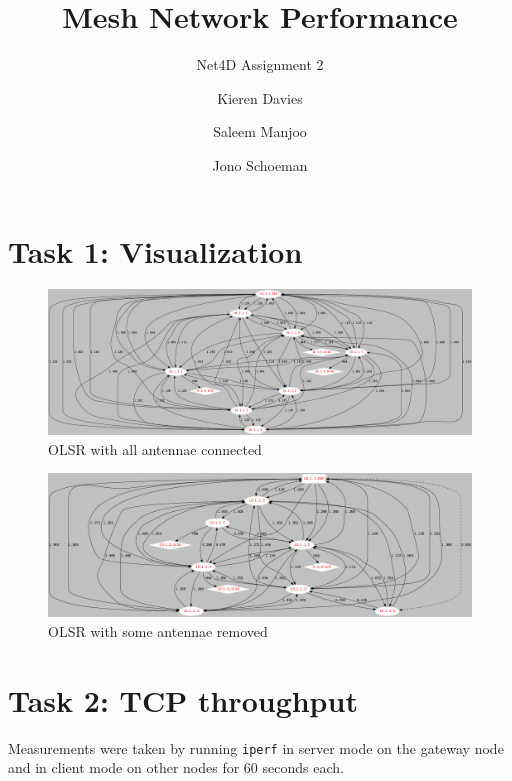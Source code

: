 \documentclass[10pt,DIV=9]{scrartcl}
\begin{document}
\title{Mesh Network Performance}
\subtitle{Net4D Assignment 2}
\author{Kieren Davies \and Saleem Manjoo \and Jono Schoeman}
\date{}
\maketitle

\section{Task 1: Visualization}

\begin{figure}[H]
  \caption{OLSR with all antennae connected}
  \includegraphics[width=\textwidth]{dot-olsr-full}
\end{figure}

\begin{figure}[H]
  \caption{OLSR with some antennae removed}
  \includegraphics[width=\textwidth]{dot-olsr-partial}
\end{figure}

\section{Task 2: TCP throughput}

Measurements were taken by running \texttt{iperf} in server mode on the gateway node and in client mode on other nodes for 60 seconds each.
\end{document}
